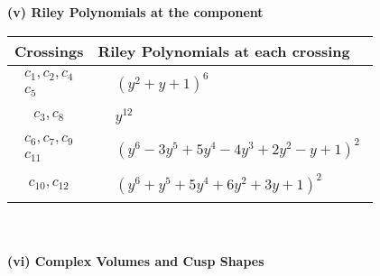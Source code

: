 \documentclass[1p]{elsarticle_modified}
\theoremstyle{definition}
\begin{document}
\newpage\renewcommand{\arraystretch}{1}
\flushleft \textbf{(v) Riley Polynomials at the component}\newline \\
\begin{tabular}{m{50pt}|m{274pt}}
Crossings & \hspace{64pt}Riley Polynomials at each crossing \\
\hline $$\begin{aligned}c_{1},c_{2},c_{4}\\c_{5}\end{aligned}$$&$\begin{aligned}
&(y^2+y+1)^6
\end{aligned}$\\
\hline $$\begin{aligned}c_{3},c_{8}\end{aligned}$$&$\begin{aligned}
&y^{12}
\end{aligned}$\\
\hline $$\begin{aligned}c_{6},c_{7},c_{9}\\c_{11}\end{aligned}$$&$\begin{aligned}
&(y^6-3 y^5+5 y^4-4 y^3+2 y^2- y+1)^2
\end{aligned}$\\
\hline $$\begin{aligned}c_{10},c_{12}\end{aligned}$$&$\begin{aligned}
&(y^6+y^5+5 y^4+6 y^2+3 y+1)^2
\end{aligned}$\\
\hline
\end{tabular}\\~\\
\newpage\flushleft \textbf{(vi) Complex Volumes and Cusp Shapes}
\end{document}
